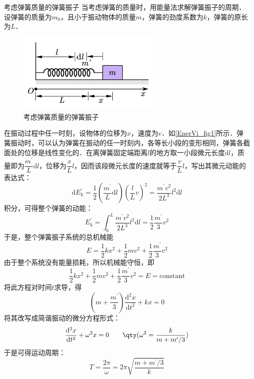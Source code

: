 \begin{example}{考虑弹簧质量的弹簧振子}
当考虑弹簧的质量时，用能量法求解弹簧振子的周期．设弹簧的质量为$m_0$，且小于振动物体的质量$m$，弹簧的劲度系数为$k$，弹簧的原长为$L$．

\begin{figure}[ht]
\centering
\includegraphics[width=7cm]{./figures/EnerVi_1.png}
\caption{考虑弹簧质量的弹簧振子} \label{EnerVi_fig1}
\end{figure}

在振动过程中任一时刻，设物体的位移为$x $，速度为$v$．如\autoref{EnerVi_fig1}所示．弹簧振动时，可以认为弹簧在振动的任一时刻内，各等长小段的变形相同，弹簧各截面处的位移是线性变化的．在离弹簧固定端距离$l$的地方取一小段微元长度$\mathrm dl$，质量即为$\dfrac{m^\prime}{L}\mathrm{d}l$，位移为$\dfrac{x}{L}l$，因而该段微元长度的速度就等于$\dfrac{v}{L}l$，写出其微元动能的表达式：
\begin{equation}
\mathrm{d} E_{\mathrm{k}}^{\prime}=\frac{1}{2}\left(\frac{m^{\prime}}{L} \mathrm{d} l\right)\left(\frac{l}{L} v\right)^{2}=\frac{m^{\prime} v^{2}}{2 L^{3}} l^{2} \mathrm{d} l
\end{equation}
积分，可得整个弹簧的动能：
\begin{equation}
E_{\mathrm{k}}^{\prime}=\int_{0}^{L} \frac{m^{\prime} v^{2}}{2 L^{3}} l^{2} \mathrm{d} l=\frac{1}{2} \frac{m^{\prime}}{3} v^{2}
\end{equation}
于是，整个弹簧振子系统的总机械能
\begin{equation}
E=\frac{1}{2} k x^{2}+\frac{1}{2} m v^{2}+\frac{1}{2} \frac{m^{\prime}}{3} v^{2}
\end{equation}
由于整个系统没有能量损耗，所以机械能守恒，即
\begin{equation}
\frac{1}{2} k x^{2}+\frac{1}{2} m v^{2}+\frac{1}{2} \frac{m^{\prime}}{3} v^{2}=E=\mathrm{constant}
\end{equation}
将此方程对时间$t $求导，得
\begin{equation}
\left(m+\frac{m^{\prime}}{3}\right) \frac{\mathrm{d}^{2} x}{\mathrm{d} t^{2}}+k x=0
\end{equation}
将其改写成简谐振动的微分方程形式：
\begin{equation}
\frac{\mathrm{d}^{2} x}{\mathrm{d} t^{2}}+\omega^{2} x=0 \qquad \qty(\omega^{2}=\frac{k}{m+m^{\prime} / 3})
\end{equation}
于是可得运动周期：
\begin{equation}
T=\frac{2 \pi}{\omega}=2 \pi \sqrt{\frac{m+m^{\prime} / 3}{k}}
\end{equation}

\end{example}
